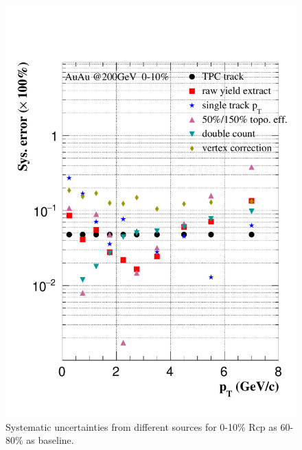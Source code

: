 \begin{figure}[htbp]
\begin{minipage}[htbp]{0.47\linewidth}
\centering
\includegraphics[width=1.0\textwidth,angle=0]{figure/Run14_D0HFT/sysErr_0_10_Rcp1.pdf}
\caption{ Systematic uncertainties from different sources for 0-10\% Rcp as 60-80\% as baseline. \label{sysErr_0_10_Rcp1}}
\end{minipage}
\hfill
\begin{minipage}[htbp]{0.47\linewidth}
\centering

\end{minipage}
\end{figure}
